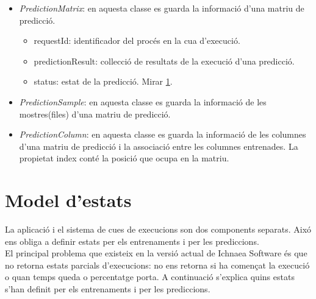 \begin{itemize}
\item \textit{PredictionMatrix}: en aquesta classe es guarda la informaci\'{o} d'una matriu de predicci\'{o}.
\begin{itemize}
\item requestId: identificador del proc\'{e}s en la cua d'execuci\'{o}.
\item predictionResult: collecci\'{o} de resultats de la execuci\'{o} d'una predicci\'{o}.
\item status: estat de la predicci\'{o}. Mirar \ref{sec:status}.
\end{itemize}

\item \textit{PredictionSample}: en aquesta classe es guarda la informaci\'{o} de les mostres(files) d'una matriu de predicci\'{o}.

\item \textit{PredictionColumn}: en aquesta classe es guarda la informaci\'{o} de les columnes d'una matriu de predicci\'{o} i la associaci\'{o} entre les columnes entrenades. La propietat index cont\'{e} la posició que ocupa en la matriu.
\end{itemize}

\section{Model d'estats}
\label{sec:status}
La aplicaci\'{o} i el sistema de cues de execucions son dos components separats. Aix\'{o} ens obliga a definir estats per els entrenaments i per les prediccions.\\

El principal problema que existeix en la versi\'{o} actual de Ichnaea Software \'{e}s que no retorna estats parcials d'execucions: no ens retorna si ha començat la execució o quan temps queda o percentatge porta. A continuaci\'{o} s'explica quins estats s'han definit per els entrenaments i per les prediccions.

